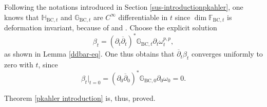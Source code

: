 \documentclass[12pt]{amsart}
\numberwithin{equation}{section}
\theoremstyle{definition}
\theoremstyle{definition}
\theoremstyle{definition}
\renewcommand{\1}{\mathsf{1}}
\newcommand{\G}{\mathbb{G}}
\renewcommand{\>}{\rightarrow}
\newcommand{\p}{\partial}
\newcommand{\bp}{\overline\partial}
\def\p{\partial}
\def\mb{\mathbb}
\theoremstyle{plain} %
\theoremstyle{plain} %
\theoremstyle{plain} %
\begin{document}
	Following the notations introduced in Section \ref{sus-introductionpkahler}, one knows that $\mb H_{\mathrm {BC},t}$ and
	$\G_{\mathrm {BC},t}$ are $C^{\infty}$ differentiable in $t$ since  $\dim
	\mathds{F}_{\mathrm {BC},t}$ is deformation invariant, because of \cite[Theorem 7]{KS60} and \cite[Theorem
	5.12]{Wu06}.
	Choose the explicit solution
	\begin{equation*}
		\beta_t=(\p_t\bp_{t})^*\G_{\mathrm {BC},t}\p_t\omega_t^{p,p},
	\end{equation*}
	as shown in Lemma \ref{ddbar-eq}. One thus obtains that $\bp_{t}\beta_t$ converges uniformly to zero with $t$, since
	\begin{equation*}
		{\beta_t}|_{t=0}=(\p_0\bp_0)^*\G_{\mathrm {BC},0}\p_0\omega_0=0.
	\end{equation*}
	
	Theorem \ref{pkahler introduction}  is, thus, proved.
	
\end{document}
